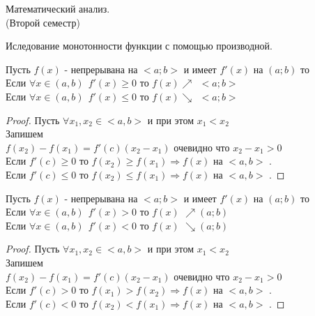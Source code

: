 \begin{title}
  Математический анализ.\\
  (Второй семестр)
\end{title}

\begin{title}
  Иследование монотонности функции с помощью производной.
\end{title}

\begin{theorem}
  Пусть $f(x)$ - непрерывана на $<a; b>$ и имеет $f'(x)$ на $(a;b)$ то
  \\
  Если $\forall x \in (a,b) ~~ f'(x) \ge 0 $ то $f(x) \nearrow ~~ <a; b>$\\
  Если $\forall x \in (a,b) ~~ f'(x) \le 0 $ то $f(x) \searrow ~~ <a; b>$
\end{theorem}

\begin{proof}
  Пусть $\forall x_1, x_2 \in <a,b>$ и при этом $x_1 < x_2 $\\
  Запишем \\
  $f(x_2) - f(x_1) = f'(c)(x_2 - x_1)$ очевидно что $x_2 - x_1 > 0 $\\
  Если $f'(c) \ge 0$ то $f(x_2) \ge f(x_1) \Rightarrow f(x)$ на $<a,b>$
  .\\
  Если $f'(c) \le 0$ то $f(x_2) \le f(x_1) \Rightarrow f(x)$ на $<a,b>$
  .
\end{proof}

\begin{theorem}
  Пусть $f(x)$ - непрерывана на $<a; b>$ и имеет $f'(x)$ на $(a;b)$ то\\
  Если $\forall x \in (a, b) ~~ f'(x) > 0$ то $f(x)$ 
  $\nearrow (a; b)$\\
  Если $\forall x \in (a, b) ~~ f'(x) < 0$ то $f(x)$ 
  $\searrow (a; b)$
\end{theorem}

\begin{proof}
  Пусть $\forall x_1, x_2 \in <a,b>$ и при этом $x_1 < x_2 $\\
  Запишем \\
  $f(x_2) - f(x_1) = f'(c)(x_2 - x_1)$ очевидно что $x_2 - x_1 > 0$\\
  Если $f'(c) > 0$ то $f(x_1) > f(x_2) \Rightarrow f(x)$ на $<a,b>$
  .\\
  Если $f'(c) < 0$ то $f(x_2) < f(x_1) \Rightarrow f(x)$ на $<a,b>$
  .
\end{proof}

